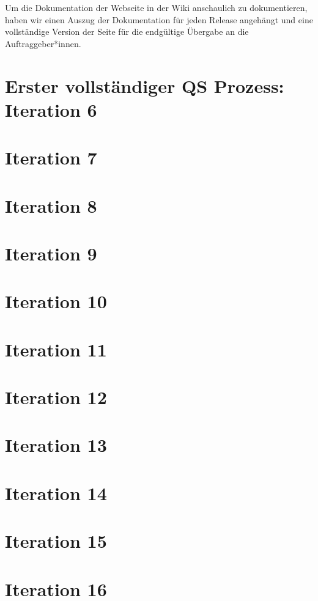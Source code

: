 \documentclass[accentcolor=tud0b,12pt,paper=a4]{tudreport}
\begin{document}
Um die Dokumentation der Webseite in der Wiki anschaulich zu dokumentieren, haben wir einen Auszug der Dokumentation für jeden Release angehängt und eine vollständige Version der Seite für die endgültige Übergabe an die Auftraggeber*innen.

\section*{Erster vollständiger QS Prozess: Iteration 6}

\section*{Iteration 7}

\section*{Iteration 8}

\section*{Iteration 9}

\section*{Iteration 10}

\section*{Iteration 11}

\section*{Iteration 12}

\section*{Iteration 13}

\section*{Iteration 14}

\section*{Iteration 15}

\section*{Iteration 16}
\end{document}

